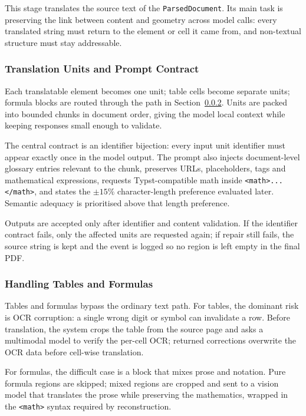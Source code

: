This stage translates the source text of the \texttt{ParsedDocument}. Its main
task is preserving the link between content and geometry across model calls:
every translated string must return to the element or cell it came from, and
non-textual structure must stay addressable.

\subsubsection{Translation Units and Prompt Contract}
\label{subsubsec:prompt}

Each translatable element becomes one unit; table cells become separate units;
formula blocks are routed through the path in Section~\ref{subsubsec:special}.
Units are packed into bounded chunks in document order, giving the model local
context while keeping responses small enough to validate.

The central contract is an identifier bijection: every input unit identifier
must appear exactly once in the model output. The prompt also injects
document-level glossary entries relevant to the chunk, preserves URLs,
placeholders, tags and mathematical expressions, requests Typst-compatible math
inside \texttt{<math>...</math>}, and states the $\pm15\%$ character-length
preference evaluated later. Semantic adequacy is prioritised above that length
preference.

Outputs are accepted only after identifier and content validation. If the
identifier contract fails, only the affected units are requested again; if
repair still fails, the source string is kept and the event is logged so no
region is left empty in the final PDF.

\subsubsection{Handling Tables and Formulas}
\label{subsubsec:special}

Tables and formulas bypass the ordinary text path. For tables, the dominant risk
is OCR corruption: a single wrong digit or symbol can invalidate a row. Before
translation, the system crops the table from the source page and asks a
multimodal model to verify the per-cell OCR; returned corrections overwrite the
OCR data before cell-wise translation.

For formulas, the difficult case is a block that mixes prose and notation. Pure
formula regions are skipped; mixed regions are cropped and sent to a vision
model that translates the prose while preserving the mathematics, wrapped in the
\texttt{<math>} syntax required by reconstruction.

